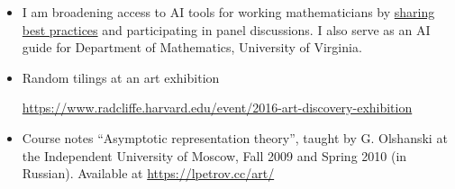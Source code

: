 \documentclass[letterpaper,11pt]{article}
\begin{document}
\begin{itemize}
	\item
	I am broadening access to AI tools for working mathematicians by \href{https://lpetrov.cc/AI-math/}{sharing} \href{https://storage.lpetrov.cc/research_files/talks/AI_UVA_Oct10.pdf}{best practices} and participating in panel discussions. I also serve as an AI guide for Department of Mathematics, University of Virginia.



	\item
	Random tilings at an art exhibition

	\url{https://www.radcliffe.harvard.edu/event/2016-art-discovery-exhibition}
	\item
	Course notes
	``Asymptotic representation theory'',
	taught by G. Olshanski
	at the Independent University of Moscow,
	Fall 2009 and Spring 2010 (in Russian).
	Available at \url{https://lpetrov.cc/art/}

\end{itemize}






\end{document}
